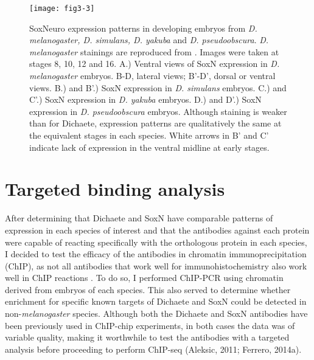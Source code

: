 \begin{figure}
\centering
\texttt{[image: fig3-3]}
\caption[SoxNeuro expression patterns in developing embryos from \emph{D. melanogaster, D. simulans, D. yakuba} and \emph{D. pseudoobscura}]{SoxNeuro expression patterns in developing embryos from \emph{D. melanogaster, D. simulans, D. yakuba} and \emph{D. pseudoobscura}. \emph{D. melanogaster} stainings are reproduced from \citet{buescher_formation_2002}. Images were taken at stages 8, 10, 12 and 16. A.) Ventral views of SoxN expression in \emph{D. melanogaster} embryos. B-D, lateral views; B'-D', dorsal or ventral views. B.) and B'.) SoxN expression in \emph{D. simulans} embryos. C.) and C'.) SoxN expression in \emph{D. yakuba} embryos. D.) and D'.) SoxN expression in \emph{D. pseudoobscura} embryos. Although staining is weaker than for Dichaete, expression patterns are qualitatively the same at the equivalent stages in each species. White arrows in B' and C' indicate lack of expression in the ventral midline at early stages.}
\label{Figure 3.3}
\end{figure}

\section{Targeted binding analysis}
After determining that Dichaete and SoxN have comparable patterns of expression in each species of interest and that the antibodies against each protein were capable of reacting specifically with the orthologous protein in each species, I decided to test the efficacy of the antibodies in chromatin immunoprecipitation (ChIP), as not all antibodies that work well for immunohistochemistry also work well in ChIP reactions \citep{landt_chip-seq_2012}. To do so, I performed ChIP-PCR using chromatin derived from embryos of each species. This also served to determine whether enrichment for specific known targets of Dichaete and SoxN could be detected in non-\emph{melanogaster} species. Although both the Dichaete and SoxN antibodies have been previously used in ChIP-chip experiments, in both cases the data was of variable quality, making it worthwhile to test the antibodies with a targeted analysis before proceeding to perform ChIP-seq (Aleksic, 2011; Ferrero, 2014a).\\

